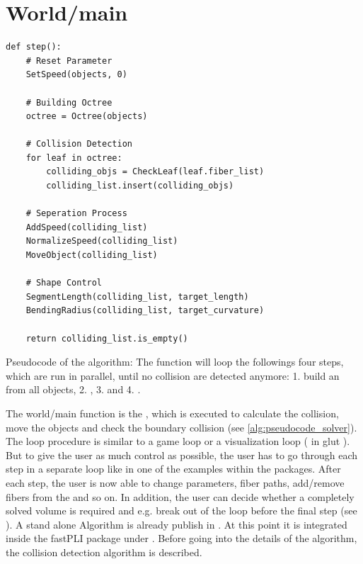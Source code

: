 \section{World/main}
% 
\begin{lstfloat}[!tb]
\lstset{style=python}
\begin{lstlisting}[]
def step():
    # Reset Parameter
    SetSpeed(objects, 0)
    
    # Building Octree
    octree = Octree(objects)
    
    # Collision Detection
    for leaf in octree:
        colliding_objs = CheckLeaf(leaf.fiber_list)
        colliding_list.insert(colliding_objs)
	
    # Seperation Process
    AddSpeed(colliding_list)
    NormalizeSpeed(colliding_list)
    MoveObject(colliding_list)
	
    # Shape Control
    SegmentLength(colliding_list, target_length)
    BendingRadius(colliding_list, target_curvature)

    return colliding_list.is_empty()
\end{lstlisting}
\caption{Pseudocode of the  algorithm: The function  will loop the followings four steps, which are run in parallel, until no collision are detected anymore: 1. build an  from all objects, 2. , 3.  and 4. . }
\label{alg:pseudocode_solver}
\end{lstfloat}
% 
The world/main function is the , which is executed to calculate the collision, move the objects and check the boundary collision (see \cref{alg:pseudocode_solver}).
The loop procedure is similar to a game loop or a visualization loop (\eg{} in glut ).
But to give the user as much control as possible, the user has to go through each step in a separate loop like in one of the examples within the packages.
After each step, the user is now able to change parameters, fiber paths, add/remove fibers from the  and so on.
In addition, the user can decide whether a completely solved volume is required and e.g. break out of the loop before the final step (see \dummy{}).
%
A stand alone Algorithm is already publish in \cite{matuschke2019}.
At this point it is integrated inside the \ac{fastPLI} package under .
Before going into the details of the algorithm, the collision detection algorithm is described.
% 
% 
% 
